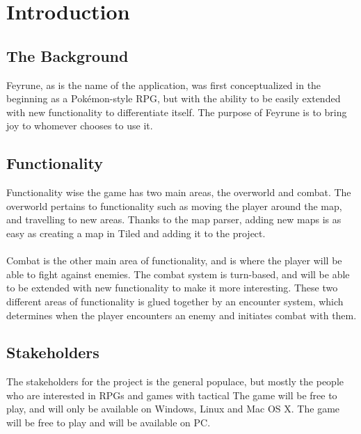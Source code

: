 \section{Introduction}

\begin{comment}
Give some background and explain the purpose of this application. Describe
the functionality of the application. Describe the stakeholders of the project,
highlight who will benefit from/use this particular application.
\end{comment}
\subsection{The Background}
Feyrune, as is the name of the application, was first conceptualized in the beginning as a Pokémon-style RPG, but with the ability to be easily extended with new functionality to differentiate itself. The purpose of Feyrune is to bring joy to whomever chooses to use it.

\subsection{Functionality}
Functionality wise the game has two main areas, the overworld and combat. The overworld pertains to functionality such as moving the player around the map, and travelling to new areas. Thanks to the map parser, adding new maps is as easy as creating a map in Tiled\cite{tiled} and adding it to the project.\\
\\
Combat is the other main area of functionality, and is where the player will be able to fight against enemies. The combat system is turn-based, and will be able to be extended with new functionality to make it more interesting. These two different areas of functionality is glued together by an encounter system, which determines when the player encounters an enemy and initiates combat with them.

\subsection{Stakeholders}
The stakeholders for the project is the general populace, but mostly the people who are interested in RPGs and games with tactical The game will be free to play, and will only be available on Windows, Linux and Mac OS X. The game will be free to play and will be available on PC.



